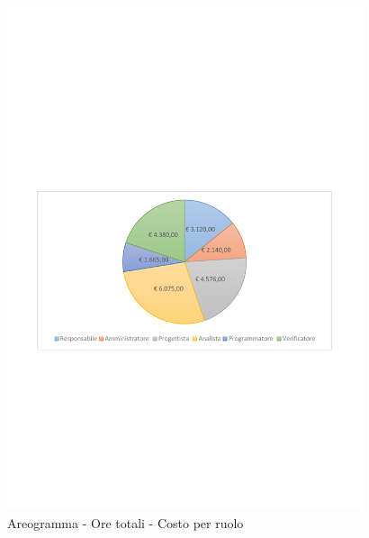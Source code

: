 \documentclass[../PianoProgetto.tex]{subfiles}
\begin{document}
	\begin{figure}[!h]
		\centering
		\includegraphics[width=0.93\textwidth , trim=2cm 9.5cm 2cm 11cm]{grafici/Riepilogo/Totali/costo}
			\caption{Areogramma - Ore totali - Costo per ruolo}
		\label{fig:CircleChart-totale_ore}
	\end{figure}
\vfill
\end{document}
